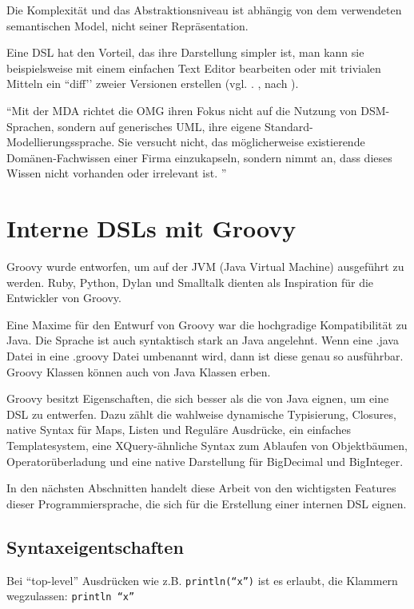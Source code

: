 \documentclass[11pt,english,ngerman, headsepline]{scrreprt}
\begin{document}
Die Komplexität und das Abstraktionsniveau ist abhängig von dem verwendeten
semantischen Model, nicht seiner Repräsentation. 

Eine DSL hat den Vorteil, das ihre Darstellung simpler ist, man kann sie
beispielsweise mit einem einfachen Text Editor bearbeiten oder mit trivialen
Mitteln ein ``diff’’ zweier Versionen erstellen (vgl.  \cite{cuadrado2007building}.
\cite{spinellis2008rational}, nach \cite{biekermetaprogrammierung}).

``Mit der MDA richtet die OMG ihren Fokus nicht auf die Nutzung
von DSM-Sprachen, sondern auf generisches UML, ihre
eigene Standard-Modellierungssprache. Sie versucht nicht, das
möglicherweise existierende Domänen-Fachwissen einer Firma
einzukapseln, sondern nimmt an, dass dieses Wissen nicht
vorhanden oder irrelevant ist. '' \cite{dsmUhrenArtikel}
 

\section{Interne DSLs mit Groovy}

Groovy wurde entworfen, um auf der JVM (Java Virtual Machine)
ausgeführt zu werden. Ruby, Python, Dylan und Smalltalk dienten als Inspiration
für die Entwickler von Groovy.

Eine Maxime für den Entwurf von Groovy war die hochgradige Kompatibilität zu
Java. Die Sprache ist auch syntaktisch stark an Java angelehnt. Wenn eine .java
Datei in eine .groovy Datei umbenannt wird, dann ist diese genau so ausführbar.
Groovy Klassen können auch von Java Klassen erben.

Groovy besitzt Eigenschaften, die sich besser als die von Java eignen, um eine
DSL zu entwerfen. Dazu zählt die wahlweise dynamische Typisierung, Closures,
native Syntax für Maps, Listen und Reguläre Ausdrücke, ein einfaches
Templatesystem, eine
XQuery-ähnliche Syntax zum Ablaufen von Objektbäumen, Operatorüberladung und
eine native Darstellung für BigDecimal und BigInteger.  

In den nächsten Abschnitten handelt diese Arbeit von den wichtigsten Features
dieser Programmiersprache, die sich für die Erstellung einer internen DSL
eignen. 


\subsection{Syntaxeigentschaften}

Bei ``top-level'' Ausdrücken wie z.B. \texttt{println(``x'')} ist es erlaubt,
die Klammern wegzulassen: \texttt{println ``x'' }
 
\end{document}
